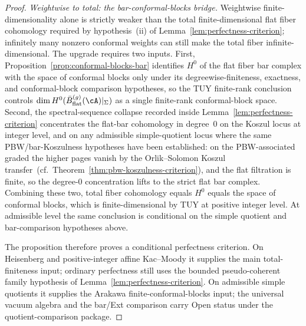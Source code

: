 \begin{proof}
\emph{Weightwise to total: the bar-conformal-blocks bridge.}
Weightwise finite-dimensionality alone is strictly weaker than the
total finite-dimensional flat fiber cohomology required by
hypothesis~\textup{(ii)} of
Lemma~\ref{lem:perfectness-criterion}; infinitely many nonzero
conformal weights can still make the total fiber
infinite-dimensional. The upgrade requires two inputs. First,
Proposition~\ref{prop:conformal-blocks-bar} identifies
$H^0$ of the flat fiber bar complex with the space of conformal
blocks only under its degreewise-finiteness, exactness, and
conformal-block comparison hypotheses,
so the TUY finite-rank conclusion controls
$\dim H^0(\bar B^{(g)}_{\mathrm{flat}}(\cA)|_\Sigma)$ as a single
finite-rank conformal-block space. Second, the spectral-sequence collapse
recorded inside Lemma~\ref{lem:perfectness-criterion} concentrates
the flat-bar cohomology in degree~$0$ on the Koszul locus at
integer level, and on any admissible simple-quotient locus where the
same PBW/bar-Koszulness hypotheses have been established: on the
PBW-associated graded
the higher pages vanish by the Orlik--Solomon Koszul
transfer~\textup{(cf.~Theorem~\ref{thm:pbw-koszulness-criterion})},
and the flat filtration is finite, so the degree-$0$ concentration
lifts to the strict flat bar complex. Combining these two, total
fiber cohomology equals $H^0$ equals the space of conformal blocks,
which is finite-dimensional by TUY at positive integer level.  At
admissible level the same conclusion is conditional on the simple
quotient and bar-comparison hypotheses above.

The proposition therefore proves a conditional perfectness criterion.
On Heisenberg and positive-integer affine Kac--Moody it supplies the
main total-finiteness input; ordinary perfectness still uses the
bounded pseudo-coherent family hypothesis of
Lemma~\ref{lem:perfectness-criterion}.  On admissible simple
quotients it supplies the Arakawa finite-conformal-blocks input;
the universal vacuum algebra and the bar/Ext comparison carry Open
status under the quotient-comparison package.
\end{proof}

